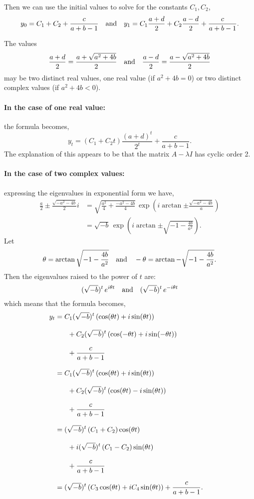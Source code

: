 \documentclass[../MathsNotesBase.tex]{subfiles}
\begin{document}
{		Then we can use the initial values to solve for the constants ${ C_1, C_2 }$,
		\[ y_0 = C_1 + C_2 + \frac{c}{a+b-1} \hspace{10pt}\text{and}\hspace{10pt} y_1 = C_1 \frac{a+d}{2} + C_2 \frac{a-d}{2} + \frac{c}{a+b-1}. \]
		
		The values 
		\[ \frac{a+d}{2} = \frac{a + \sqrt{a^2 + 4b}}{2} \hspace{10pt}\text{and}\hspace{10pt} \frac{a-d}{2} = \frac{a - \sqrt{a^2 + 4b}}{2} \]
		may be two distinct real values, one real value (if ${ a^2 + 4b = 0 }$) or two distinct complex values (if ${ a^2 + 4b < 0 }$).
		
		\paragraph{In the case of one real value:} the formula becomes,
		\[ y_t = (C_1 + C_2 t) \frac{(a+d)^t}{2^t} + \frac{c}{a+b-1}. \]
		The explanation of this appears to be that the matrix ${ A - \lambda I }$ has cyclic order 2. 
		
		\paragraph{In the case of two complex values:} expressing the eigenvalues in exponential form we have,
		\begin{align*}
		\frac{a}{2} \pm \frac{\sqrt{-a^2 - 4b}}{2} i &= \sqrt{ \frac{a^2}{4} + \frac{-a^2 - 4b}{4} }\, \exp\left(i\arctan{\pm\frac{\sqrt{-a^2 - 4b}}{a}}\right) \\[4pt]
		&= \sqrt{-b}\, \exp\left(i\arctan{\pm\sqrt{-1 - \frac{4b}{a^2}}}\right).
		\end{align*}
		Let 
		\[ \theta = \arctan{\sqrt{-1 - \frac{4b}{a^2}}} \hspace{10pt}\text{and}\hspace{10pt} -\theta = \arctan{-\sqrt{-1 - \frac{4b}{a^2}}}. \]
		Then the eigenvalues raised to the power of $t$ are:
		\[ (\sqrt{-b})^t\, e^{i \theta t} \hspace{10pt}\text{and}\hspace{10pt} (\sqrt{-b})^t\, e^{-i \theta t} \]
		which means that the formula becomes,
		\begin{align*}
		y_t &= C_1(\sqrt{-b})^t\, (\cos(\theta t) + i \sin(\theta t))\\[8pt]
			&\hspace{18pt} +  C_2(\sqrt{-b})^t\, (\cos(-\theta t) + i \sin(-\theta t)) \\[8pt]
			&\hspace{18pt} +  \frac{c}{a+b-1} \\[8pt]
		&= C_1(\sqrt{-b})^t\, (\cos(\theta t) + i \sin(\theta t))\\[8pt]
			&\hspace{18pt} +  C_2(\sqrt{-b})^t\, (\cos(\theta t) - i \sin(\theta t)) \\[8pt]
			&\hspace{18pt} +  \frac{c}{a+b-1} &\text{\scriptsize{}} \\[8pt]
		&= (\sqrt{-b})^t\, (C_1 + C_2)\cos(\theta t) \\[8pt]
			&\hspace{18pt} + i (\sqrt{-b})^t\, (C_1 - C_2) \sin(\theta t) \\[8pt]
			&\hspace{18pt} +  \frac{c}{a+b-1} &\text{\scriptsize{}} \\[8pt]
		&= (\sqrt{-b})^t\, (C_3\cos(\theta t) + i C_4 \sin(\theta t)) +  \frac{c}{a+b-1}.
		\end{align*}
		
}
\end{document}
